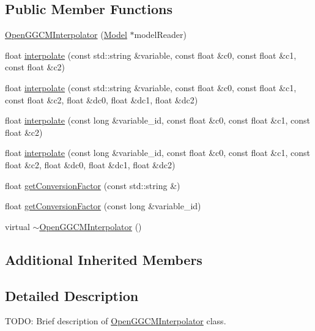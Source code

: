 \subsection*{Public Member Functions}
\begin{DoxyCompactItemize}
\item 
\hyperlink{classccmc_1_1_open_g_g_c_m_interpolator_a84fbb6f23e96390811de72a5e59f9af2}{Open\-G\-G\-C\-M\-Interpolator} (\hyperlink{classccmc_1_1_model}{Model} $\ast$model\-Reader)
\item 
float \hyperlink{classccmc_1_1_open_g_g_c_m_interpolator_ada03d607a868a005e25149751fa3ecd6}{interpolate} (const std\-::string \&variable, const float \&c0, const float \&c1, const float \&c2)
\item 
float \hyperlink{classccmc_1_1_open_g_g_c_m_interpolator_a7a0efca7f1d0be57e3b2c9fe949ba6b7}{interpolate} (const std\-::string \&variable, const float \&c0, const float \&c1, const float \&c2, float \&dc0, float \&dc1, float \&dc2)
\item 
float \hyperlink{classccmc_1_1_open_g_g_c_m_interpolator_a435af4215d0422904bea0c40bd6ef3f2}{interpolate} (const long \&variable\-\_\-id, const float \&c0, const float \&c1, const float \&c2)
\item 
float \hyperlink{classccmc_1_1_open_g_g_c_m_interpolator_ad7edc3f7862deda978513f923fc30c33}{interpolate} (const long \&variable\-\_\-id, const float \&c0, const float \&c1, const float \&c2, float \&dc0, float \&dc1, float \&dc2)
\item 
float \hyperlink{classccmc_1_1_open_g_g_c_m_interpolator_a3f6b9cad28a121b7273285d85393af95}{get\-Conversion\-Factor} (const std\-::string \&)
\item 
float \hyperlink{classccmc_1_1_open_g_g_c_m_interpolator_aea6ad6b4893cdd9d93fef7d86f934f38}{get\-Conversion\-Factor} (const long \&variable\-\_\-id)
\item 
virtual \hyperlink{classccmc_1_1_open_g_g_c_m_interpolator_abda9b1d9153c16321e44b526ad4f1f3a}{$\sim$\-Open\-G\-G\-C\-M\-Interpolator} ()
\end{DoxyCompactItemize}
\subsection*{Additional Inherited Members}


\subsection{Detailed Description}
T\-O\-D\-O\-: Brief description of \hyperlink{classccmc_1_1_open_g_g_c_m_interpolator}{Open\-G\-G\-C\-M\-Interpolator} class. 

